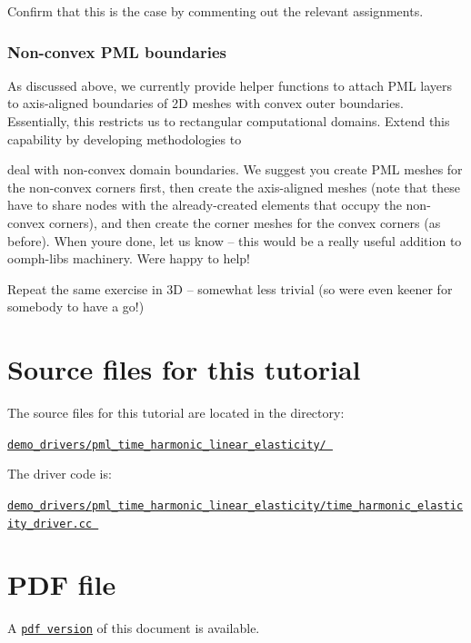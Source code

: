 Confirm that this is the case by commenting out the relevant assignments.\hypertarget{index_non_convex}{}\subsubsection{Non-\/convex P\+M\+L boundaries}\label{index_non_convex}
As discussed above, we currently provide helper functions to attach P\+ML layers to axis-\/aligned boundaries of 2D meshes with convex outer boundaries. Essentially, this restricts us to rectangular computational domains. Extend this capability by developing methodologies to
\begin{DoxyItemize}
\item deal with non-\/convex domain boundaries. We suggest you create P\+ML meshes for the non-\/convex corners first, then create the axis-\/aligned meshes (note that these have to share nodes with the already-\/created elements that occupy the non-\/convex corners), and then create the corner meshes for the convex corners (as before). When you\textquotesingle{}re done, let us know -- this would be a really useful addition to oomph-\/lib\textquotesingle{}s machinery. We\textquotesingle{}re happy to help!
\item Repeat the same exercise in 3D -- somewhat less trivial (so we\textquotesingle{}re even keener for somebody to have a go!)
\end{DoxyItemize}

 

\hypertarget{index_sources}{}\section{Source files for this tutorial}\label{index_sources}

\begin{DoxyItemize}
\item The source files for this tutorial are located in the directory\+: \begin{center} \href{../../../demo_drivers/pml_time_harmonic_linear_elasticity/}{\tt demo\+\_\+drivers/pml\+\_\+time\+\_\+harmonic\+\_\+linear\+\_\+elasticity/ } \end{center} 
\item The driver code is\+: \begin{center} \href{../../../demo_drivers/pml_time_harmonic_linear_elasticity/time_harmonic_elasticity_driver.cc}{\tt demo\+\_\+drivers/pml\+\_\+time\+\_\+harmonic\+\_\+linear\+\_\+elasticity/time\+\_\+harmonic\+\_\+elasticity\+\_\+driver.\+cc } \end{center} 
\end{DoxyItemize}



 

 \hypertarget{index_pdf}{}\section{P\+D\+F file}\label{index_pdf}
A \href{../latex/refman.pdf}{\tt pdf version} of this document is available. 
